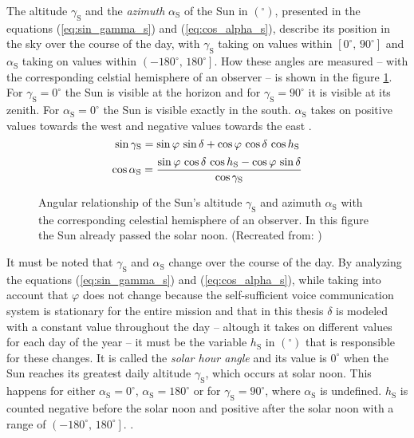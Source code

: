 The altitude $\gamma_{\mathrm{S}}$ and the \emph{azimuth} $\alpha_{\mathrm{S}}$ of the Sun in $\left(^\circ \right)$, presented in the equations (\ref{eq:sin_gamma_s}) and (\ref{eq:cos_alpha_s}), describe its position in the sky over the course of the day, with $\gamma_{\mathrm{S}}$ taking on values within $\left[0^\circ \text{, } 90^\circ\right]$ and $\alpha_{\mathrm{S}}$ taking on values within $\left(-180^\circ \text{, } 180^\circ \right]$. How these angles are measured -- with the corresponding celstial hemisphere of an observer -- is shown in the figure \ref{fig:tikz_gamma_s_alpha_s}. For $\gamma_{\mathrm{S}} = 0^\circ$ the Sun is visible at the horizon and for $\gamma_{\mathrm{S}} = 90^\circ$ it is visible at its zenith. For $\alpha_{\mathrm{S}} = 0^\circ$ the Sun is visible exactly in the south. $\alpha_{\mathrm{S}}$ takes on positive values towards the west and negative values towards the east \cite{Landis:1995, Karttunen:2006, Mertens:2015, Wagner:2018}.
	\begin{equation} \label{eq:sin_gamma_s}
	\centering
		\sin \gamma_{\mathrm{S}} = \sin \varphi \, \sin \delta + \cos \varphi \, \cos \delta \, \cos h_{\mathrm{S}}
	\end{equation}
	\begin{equation} \label{eq:cos_alpha_s}
	\centering
		\cos \alpha_{\mathrm{S}} = \frac{\sin \varphi \, \cos \delta \, \cos h_{\mathrm{S}} - \cos \varphi \, \sin \delta}{\cos \gamma_{\mathrm{S}}}
	\end{equation}
\begin{figure}[h!]
	\centering
	
	\caption{Angular relationship of the Sun's altitude $\gamma_{\mathrm{S}}$ and azimuth $\alpha_{\mathrm{S}}$ with the corresponding celestial hemisphere of an observer. In this figure the Sun already passed the solar noon. (Recreated from: \cite{Mertens:2015})}
	\label{fig:tikz_gamma_s_alpha_s}
\end{figure}

It must be noted that $\gamma_{\mathrm{S}}$ and $\alpha_{\mathrm{S}}$ change over the course of the day. By analyzing the equations (\ref{eq:sin_gamma_s}) and (\ref{eq:cos_alpha_s}), while taking into account that $\varphi$ does not change because the self-sufficient voice communication system is stationary for the entire mission and that in this thesis $\delta$ is modeled with a constant value throughout the day -- altough it takes on different values for each day of the year -- it must be the variable $h_{\mathrm{S}}$ in $\left(^\circ\right)$ that is responsible for these changes. It is called the \emph{solar hour angle} and its value is $0^\circ$ when the Sun reaches its greatest daily altitude $\gamma_{\mathrm{S}}$, which occurs at solar noon. This happens for either $\alpha_{\mathrm{S}} = 0^\circ$, $\alpha_{\mathrm{S}} = 180^\circ$ or for $\gamma_{\mathrm{S}} = 90^\circ$, where $\alpha_{\mathrm{S}}$ is undefined. $h_{\mathrm{S}}$ is counted negative before the solar noon and positive after the solar noon with a range of $\left(-180^\circ \text{, } 180^\circ\right]$. \cite{Landis:1995, Karttunen:2006, Mertens:2015, Wagner:2018}.  

